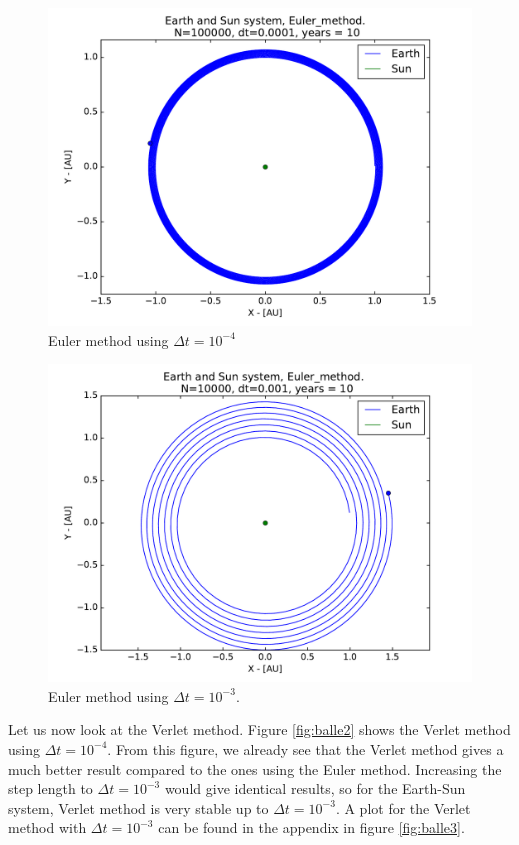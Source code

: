 \documentclass{article}
\begin{document}
\begin{figure}[!h]
\centering
\includegraphics[width=\linewidth]{Plots/Earth_Sun_Euler_method.pdf}
\caption{Euler method using $\Delta t = 10^{-4}$}
\label{fig:balle}
\end{figure}
\begin{figure}[!h]
\centering
\includegraphics[width=\linewidth]{Plots/Earth_Sun_Euler_method_larger_dt.pdf}
\caption{Euler method using $\Delta t = 10^{-3}$.}
\label{fig:balle1}
\end{figure}
Let us now look at the Verlet method. Figure \ref{fig:balle2} shows the Verlet method using $\Delta t = 10^{-4}$. From this figure, we already see that the Verlet method gives a much better result compared to the ones using the Euler method. Increasing the step length to $\Delta t = 10^{-3}$ would give identical results, so for the Earth-Sun system, Verlet method is very stable up to $\Delta t = 10^{-3}$. A plot for the Verlet method with $\Delta t = 10^{-3}$ can be found in the appendix in figure \ref{fig:balle3}. \\
\end{document}
